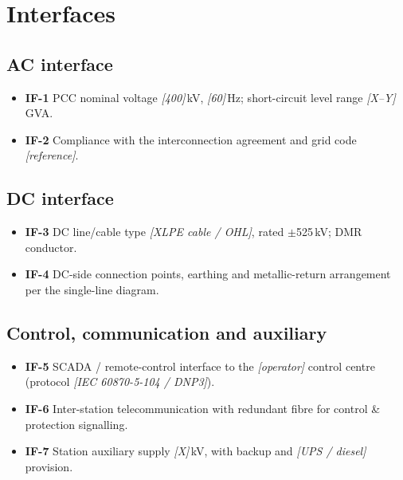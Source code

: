 \section{Interfaces}

\subsection{AC interface}
\begin{itemize}\setlength{\itemsep}{0.2em}
  \item \textbf{IF-1} PCC nominal voltage \emph{[400]}\,kV, \emph{[60]}\,Hz;
        short-circuit level range \emph{[X--Y]}\,GVA.
  \item \textbf{IF-2} Compliance with the interconnection agreement and grid
        code \emph{[reference]}.
\end{itemize}

\subsection{DC interface}
\begin{itemize}\setlength{\itemsep}{0.2em}
  \item \textbf{IF-3} DC line/cable type \emph{[XLPE cable / OHL]}, rated
        $\pm$525\,kV; DMR conductor.
  \item \textbf{IF-4} DC-side connection points, earthing and metallic-return
        arrangement per the single-line diagram.
\end{itemize}

\subsection{Control, communication and auxiliary}
\begin{itemize}\setlength{\itemsep}{0.2em}
  \item \textbf{IF-5} SCADA / remote-control interface to the \emph{[operator]}
        control centre (protocol \emph{[IEC 60870-5-104 / DNP3]}).
  \item \textbf{IF-6} Inter-station telecommunication with redundant fibre for
        control \& protection signalling.
  \item \textbf{IF-7} Station auxiliary supply \emph{[X]}\,kV, with backup and
        \emph{[UPS / diesel]} provision.
\end{itemize}
